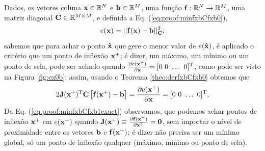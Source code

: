 \begin{myproofT}\label{proof:theo:minfxbCfxb}
Dados,
os vetores coluna $\VECTOR{x}\in \mathbb{R}^N$ e $\VECTOR{b}\in \mathbb{R}^M$,  
uma função $\VECTOR{f}:\mathbb{R}^{N} \rightarrow \mathbb{R}^{M}$, 
uma matriz diagonal $\MATRIX{C} \in \mathbb{R}^{M\times M}$, e 
definida a Eq. (\ref{eq:proof:minfxbCfxb0}),
\begin{equation}\label{eq:proof:minfxbCfxb0}
e(\VECTOR{x})=||\VECTOR{f}(\VECTOR{x})-\VECTOR{b}||_{\MATRIX{C}}^2;
\end{equation}
sabemos que para achar o ponto $\VECTOR{\hat{x}}$ que gere o menor valor de $e(\VECTOR{\hat{x}})$, é aplicado
o critério que um ponto de inflexão $\VECTOR{x}^+$; é dizer, um máximo, um mínimo ou um ponto de sela, pode ser achado quando 
$\frac{\partial e(\VECTOR{x}^+)}{\partial \VECTOR{x} }=[0~ 0~ \hdots~ 0 ]^{\transpose}$, como pode ser visto na Figura \ref{fig:ex0b};
assim, usando o Teorema \ref{theo:derfxbCfxb0} obtemos que
\begin{equation}\label{eq:proof:minfxbCfxb1exact}
2 \MATRIX{J}(\VECTOR{x}^+)^{\transpose}\MATRIX{C}\left[ \VECTOR{f}(\VECTOR{x}^+)-\VECTOR{b} \right] =
\frac{\partial e(\VECTOR{x}^+)}{\partial \VECTOR{x} }=[0~ 0~ \hdots~ 0 ]^{\transpose},
\end{equation}
Da Eq. (\ref{eq:proof:minfxbCfxb1exact}) observamos, que podemos achar pontos de inflexão $\VECTOR{x}^+$
em $e(\VECTOR{x}^+)$ quando 
$\MATRIX{J}(\VECTOR{x}^+) \equiv \frac{\partial \VECTOR{f}(\VECTOR{x}^+)}{\partial \VECTOR{x}^{\transpose} } = \MATRIX{0}$, 
sem importar o nível de proximidade entre os vetores $\VECTOR{b}$ e $\VECTOR{f}(\VECTOR{x}^+)$;
é dizer não precisa ser um mínimo global, só um ponto de inflexão qualquer
(máximo, mínimo ou ponto de sela).


\end{myproofT}
